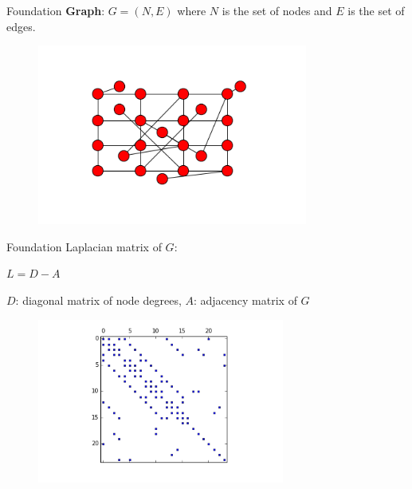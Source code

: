 \documentclass[xcolor=dvipsnames,10pt]{beamer}
\begin{document}
\begin{frame}{Foundation}
\vspace{.3in}
\textbf{Graph}: $G=(N,E)$ where $N$ is the set of nodes and $E$ is the set of edges.

\begin{figure}
\begin{center}
\includegraphics[width = 3.5in]{entiregraph.png}
\end{center}
\end{figure}
\end{frame}




\begin{frame}{Foundation}
\vspace{.3in}
Laplacian matrix of $G$:\\
\begin{center}
$L=D-A$\\
\end{center}
$D$: diagonal matrix of node degrees, $A$: adjacency matrix of $G$

\begin{figure}
\begin{center}
\includegraphics[width = 3.2in]{gridspy.png}
\end{center}
\end{figure}
\end{frame}
\end{document}
